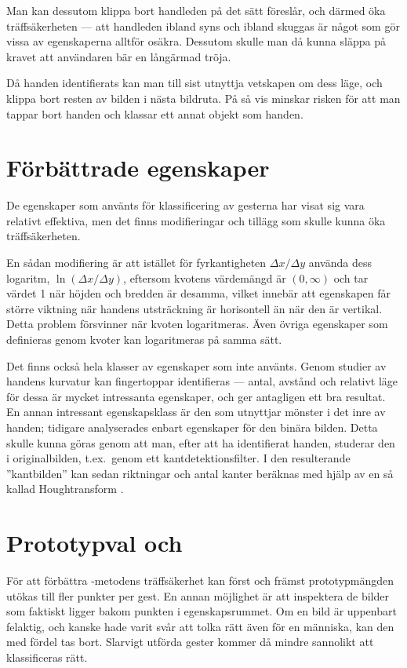 \documentclass[../rapport_MVEX01-11-05]{subfiles}
\begin{document}
Man kan dessutom klippa bort handleden på det sätt
 föreslår, och därmed öka träffsäkerheten --- att
handleden ibland syns och ibland skuggas är något som gör vissa av 
egenskaperna alltför osäkra. Dessutom skulle man då kunna släppa på kravet
att användaren bär en långärmad tröja.

Då handen identifierats kan man till sist utnyttja
vetskapen om dess läge, och
klippa bort resten av bilden i nästa bildruta.
På så vis minskar risken för att man tappar bort handen och
klassar ett annat objekt som handen.

\section{Förbättrade egenskaper}
De egenskaper som använts för klassificering av gesterna har visat sig vara relativt
effektiva, men det finns modifieringar och tillägg som skulle kunna
öka träffsäkerheten. 

En sådan modifiering är att istället för fyrkantigheten $\Delta
x/\Delta y$ använda dess logaritm, $\ln(\Delta x/\Delta
y)$, eftersom kvotens värdemängd är $(0,\infty)$ och tar värdet 1 när
höjden och bredden är desamma, vilket innebär att egenskapen får större
viktning när handens utsträckning är horisontell än när den är vertikal. Detta problem
försvinner när kvoten logaritmeras. Även övriga egenskaper som
definieras genom kvoter kan logaritmeras på samma sätt.

Det finns också hela klasser av egenskaper som inte använts.
Genom studier av handens kurvatur kan fingertoppar 
identifieras --- antal, avstånd och relativt läge för dessa är
mycket intressanta egenskaper, och ger antagligen ett bra resultat.
En annan intressant egenskapsklass är den som utnyttjar mönster i det
inre av handen; tidigare analyserades enbart egenskaper för den binära bilden.
Detta skulle kunna göras
genom att man, efter att ha identifierat handen, studerar den
i originalbilden, t.ex.~genom ett kantdetektionsfilter.
I den resulterande ''kantbilden'' kan sedan riktningar och antal kanter
beräknas med hjälp av en så kallad Houghtransform \cite{Duda72}.

\section{Prototypval och \knn}
För att förbättra \knn-metodens träffsäkerhet kan först och
främst prototypmängden utökas till fler punkter per gest. En annan
möjlighet är att inspektera de bilder som faktiskt ligger bakom
punkten i egenskapsrummet. Om en bild är uppenbart felaktig, och kanske hade varit
svår att tolka rätt även för en människa, kan den med fördel tas bort.
Slarvigt utförda gester kommer då mindre sannolikt att
klassificeras rätt.
\end{document}
